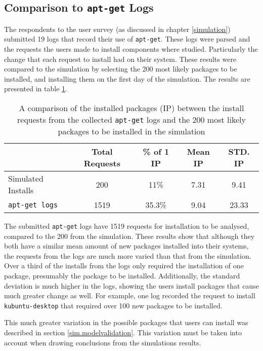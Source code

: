 \subsection{Comparison to \texttt{apt-get} Logs}
The respondents to the user survey (as discussed in chapter \ref{simulation}) submitted 19 logs that record their use of \texttt{apt-get}.
These logs were parsed and the requests the users made to install components where studied.
Particularly the change that each request to install had on their system.
These results were compared to the simulation by selecting the 200 most likely packages to be installed, and installing them on the first day of the simulation.
The results are presented in table \ref{implementation.validlogs}.

\begin{table}[htp]
\begin{center}
\begin{tabular}{| l | c | c | c | c |}
\hline
& Total Requests & \% of 1 IP & Mean IP & STD. IP \\ \hline
Simulated Installs				& 200 	& 11\% 		 	& 7.31 	& 9.41 \\
\texttt{apt-get logs} 	& 1519 	& 35.3\% 	 	& 9.04 	& 23.33 \\ \hline
\end{tabular}
\end{center}
\caption{A comparison of the installed packages (IP) between the install requests from the collected \texttt{apt-get} logs and the 200 most likely packages to be installed in the simulation}
\label{implementation.validlogs}
\end{table}
The submitted \texttt{apt-get} logs have 1519 requests for installation to be analysed, compared to the 200 from the simulation.
These results show that although they both have a similar mean amount of new packages installed into their systems, 
the requests from the logs are much more varied than that from the simulation.
Over a third of the installs from the logs only required the installation of one package, presumably the package to be installed.
Additionally, the standard deviation is much higher in the logs, showing the users install packages that cause much greater change as well.
For example, one log recorded the request to install \texttt{kubuntu-desktop} that required over 100 new packages to be installed.

This much greater variation in the possible packages that users can install was described in section \ref{sim.modelvalidation}.
This variation must be taken into account when drawing conclusions from the simulations results.

